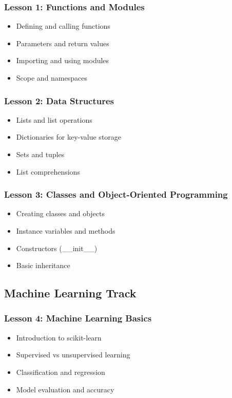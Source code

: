 \documentclass[11pt,letterpaper]{article}
\begin{document}
\subsubsection{Lesson 1: Functions and Modules}
\begin{itemize}[leftmargin=*]
    \item Defining and calling functions
    \item Parameters and return values
    \item Importing and using modules
    \item Scope and namespaces
\end{itemize}

\subsubsection{Lesson 2: Data Structures}
\begin{itemize}[leftmargin=*]
    \item Lists and list operations
    \item Dictionaries for key-value storage
    \item Sets and tuples
    \item List comprehensions
\end{itemize}

\subsubsection{Lesson 3: Classes and Object-Oriented Programming}
\begin{itemize}[leftmargin=*]
    \item Creating classes and objects
    \item Instance variables and methods
    \item Constructors (\_\_init\_\_)
    \item Basic inheritance
\end{itemize}

\subsection{Machine Learning Track}

\subsubsection{Lesson 4: Machine Learning Basics}
\begin{itemize}[leftmargin=*]
    \item Introduction to scikit-learn
    \item Supervised vs unsupervised learning
    \item Classification and regression
    \item Model evaluation and accuracy
\end{itemize}
\end{document}
